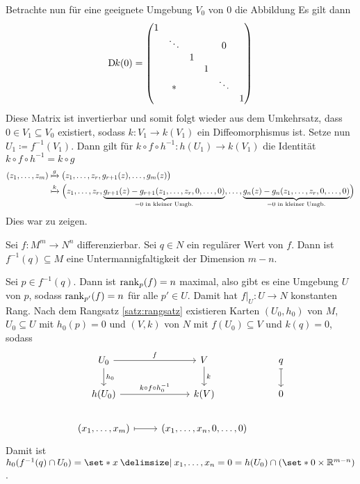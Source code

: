 \begin{beweis}
	Betrachte nun für eine geeignete Umgebung $V_0$ von 0 die Abbildung
	Es gilt dann
	\[
		\D k (0) = \begin{pmatrix}
			1 & & & & & \\
			& \ddots & & & 0 & \\
			& & 1 & & &  \\
			& & & 1 & & \\
			& * & & & \ddots & \\
			& & & & & 1
		\end{pmatrix}
	\]
	Diese Matrix ist invertierbar und somit folgt wieder aus dem Umkehrsatz, dass $0 \in V_1 \subseteq V_0$ existiert, sodass $k \colon V_1 \to k(V_1)$ ein Diffeomorphismus ist.
	Setze nun $U_1 \coloneqq f^{-1}(V_1)$.
	Dann gilt für $k \circ f \circ h^{-1} \colon h(U_1) \to k(V_1)$ die Identität $k \circ f \circ h^{-1} = k \circ g$
	\begin{align}
		(z_1, \ldots ,z_m) &\xmapsto{g} \enbrace[\big]{z_1, \ldots ,z_r, g_{r+1}(z), \ldots , g_m(z)}  \\
		&\xmapsto{k} \enbrace[\Big]{z_1, \ldots ,z_r, \Underbrace{g_{r+1}(z) - g_{r+1}(z_1, \ldots ,z_r, 0, \ldots ,0)}{=0 \text{ in kleiner Umgb.}}, \ldots , \Underbrace{g_n(z) - g_n(z_1, \ldots ,z_r,0,\ldots ,0)}{=0 \text{ in kleiner Umgb.}}}
	\end{align}
	Dies war zu zeigen.
\end{beweis}

\begin{satz}[name={vom regulären Wert}]
	Sei $f \colon M^m \to N^n$ differenzierbar.
	Sei $q \in N$ ein regulärer Wert von $f$.
	Dann ist $f^{-1}(q) \subseteq M$ eine Untermannigfaltigkeit der Dimension $m-n$.
\end{satz}
\begin{beweis}
	Sei $p \in f^{-1}(q)$.
	Dann ist $\rank_p(f) = n$ maximal, also gibt es eine Umgebung $U$ von $p$, sodass $\rank_{p'}(f) = n$ für alle $p' \in U$.
	Damit hat $f|_U \colon U \to N$ konstanten Rang.
	Nach dem Rangsatz \ref{satz:rangsatz} existieren Karten $(U_0,h_0)$ von $M$, $U_0 \subseteq U$ mit $h_0(p)=0$ und $(V,k)$ von $N$ mit $f(U_0) \subseteq V$ und $k(q)=0$, sodass 
	\[
		\begin{tikzcd}
			U_0 \rar["f"] \dar["h_0"] & V \dar["k"] & q \dar[mapsto] \\
			h(U_0) \rar["k \circ f \circ h_0^{-1}"] & k(V) &  0 \\
			(x_1, \ldots ,x_m) \rar[mapsto] & (x_1, \ldots ,x_n, 0, \ldots ,0)
		\end{tikzcd}
	\]
	Damit ist $h_0(f^{-1}(q) \cap U_0) = \set*{x \given x_1, \ldots ,x_n=0} = h(U_0) \cap \enbrace*{\set*{0} \times \mathbb{R}^{m-n}}$.
\end{beweis}

